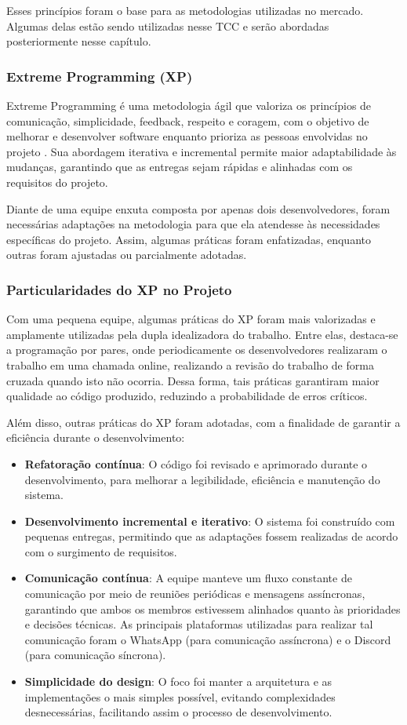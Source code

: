 Esses princípios foram o base para as metodologias utilizadas no mercado. Algumas delas estão sendo utilizadas nesse TCC e serão abordadas posteriormente nesse capítulo.

\subsubsection{Extreme Programming (XP)}
Extreme Programming é uma metodologia ágil que valoriza os princípios de comunicação, simplicidade, feedback, respeito e coragem, com o objetivo de melhorar e desenvolver software enquanto prioriza as pessoas envolvidas no projeto \cite{extremeprogramming}. Sua abordagem iterativa e incremental permite maior adaptabilidade às mudanças, garantindo que as entregas sejam rápidas e alinhadas com os requisitos do projeto. 

Diante de uma equipe enxuta composta por apenas dois desenvolvedores, foram necessárias adaptações na metodologia para que ela atendesse às necessidades específicas do projeto. Assim, algumas práticas foram enfatizadas, enquanto outras foram ajustadas ou parcialmente adotadas.

\subsubsection{Particularidades do XP no Projeto}
Com uma pequena equipe, algumas práticas do XP foram mais valorizadas e amplamente utilizadas pela dupla idealizadora do trabalho. Entre elas, destaca-se a programação por pares, onde periodicamente os desenvolvedores realizaram o trabalho em uma chamada online, realizando a revisão do trabalho de forma cruzada quando isto não ocorria. Dessa forma, tais práticas garantiram maior qualidade ao código produzido, reduzindo a probabilidade de erros críticos.

Além disso, outras práticas do XP foram adotadas, com a finalidade de garantir a eficiência durante o desenvolvimento:

\begin{itemize}
    \item \textbf{Refatoração contínua}: O código foi revisado e aprimorado durante o desenvolvimento, para melhorar a legibilidade, eficiência e manutenção do sistema.
    \item \textbf{Desenvolvimento incremental e iterativo}: O sistema foi construído com pequenas entregas, permitindo que as adaptações fossem realizadas de acordo com o surgimento de requisitos.
    \item \textbf{Comunicação contínua}: A equipe manteve um fluxo constante de comunicação por meio de reuniões periódicas e mensagens assíncronas, garantindo que ambos os membros estivessem alinhados quanto às prioridades e decisões técnicas. As principais plataformas utilizadas para realizar tal comunicação foram o WhatsApp (para comunicação assíncrona) e o Discord (para comunicação síncrona).
    \item \textbf{Simplicidade do design}: O foco foi manter a arquitetura e as implementações o mais simples possível, evitando complexidades desnecessárias, facilitando assim o processo de desenvolvimento.
\end{itemize}

